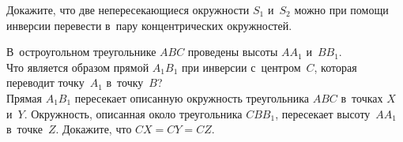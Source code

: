 \begin{problems}
\item
Докажите, что две непересекающиеся окружности $S_{1}$ и~$S_{2}$ можно при
помощи инверсии перевести в~пару концентрических окружностей.

\item
В~остроугольном треугольнике $ABC$ проведены высоты $AA_{1}$ и~$BB_{1}$.
\\
\subproblem
Что является образом прямой $A_{1}B_{1}$ при инверсии с~центром~$C$, которая
переводит точку~$A_{1}$ в~точку~$B$?
\\
\subproblem
Прямая $A_{1}B_{1}$ пересекает описанную окружность треугольника $ABC$
в~точках $X$ и~$Y$.
Окружность, описанная около треугольника $CBB_{1}$, пересекает высоту~$AA_{1}$
в~точке~$Z$.
Докажите, что $CX = CY = CZ$. 

\end{problems}

